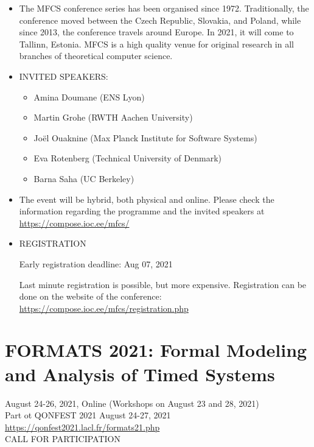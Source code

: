 \documentclass[prodmode,acmtecs]{acmsmall} %
\begin{document}
\begin{itemize}\item  The MFCS conference series has been organised since 1972. Traditionally, the conference moved between the Czech Republic, Slovakia, and Poland, while since 2013, the conference travels around Europe. In 2021, it will come to Tallinn, Estonia. MFCS is a high quality venue for original research in all branches of theoretical computer science. 
 
\item  INVITED SPEAKERS: 
 
\begin{itemize}\item  Amina Doumane (ENS Lyon)
\item  Martin Grohe (RWTH Aachen University)
\item  Joël Ouaknine (Max Planck Institute for Software Systems)
\item  Eva Rotenberg (Technical University of Denmark)
\item  Barna Saha (UC Berkeley)
\end{itemize} 
\item  The event will be hybrid, both physical and online. Please check the information regarding the programme and the invited speakers at \href{https://compose.ioc.ee/mfcs/}{https://compose.ioc.ee/mfcs/} 
 
\item  REGISTRATION 
 
Early registration deadline: Aug 07, 2021 
 
  Last minute registration is possible, but more expensive. Registration can be done on the website of the conference: \href{https://compose.ioc.ee/mfcs/registration.php}{https://compose.ioc.ee/mfcs/registration.php} 
 
\end{itemize}\section{FORMATS 2021: Formal Modeling and Analysis of Timed Systems  }\label{FORMATS2021}  August 24-26, 2021, Online (Workshops on August 23 and 28, 2021)\\ 
  Part ot QONFEST 2021 August 24-27, 2021\\ 
  \href{https://qonfest2021.lacl.fr/formats21.php}{https://qonfest2021.lacl.fr/formats21.php}\\ 
CALL FOR PARTICIPATION 
\end{document}

